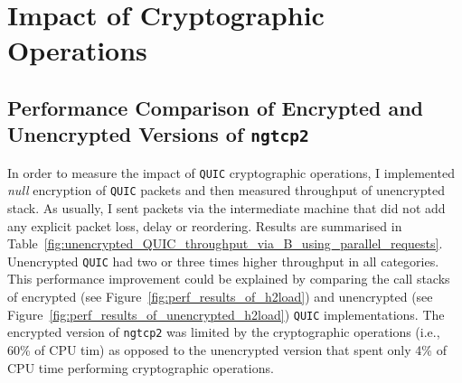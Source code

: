 \documentclass[12pt,a4paper]{report}
\newcommand\note[2]{{\color{#1}\bf #2}}
\newcommand\simon[1]{\ifcomments{\note{cyan}{SM: #1}}\fi}
\begin{document}
\section{Impact of Cryptographic Operations}




\subsection{Performance Comparison of Encrypted and Unencrypted Versions of \texttt{ngtcp2}}

In order to measure the impact of \texttt{QUIC} cryptographic operations, I implemented \textit{null} encryption of \texttt{QUIC} packets and then measured throughput of unencrypted stack.
As usually, I sent packets via the intermediate machine that did not add any explicit packet loss, delay or reordering.
Results are summarised in Table~\ref{fig:unencrypted_QUIC_throughput_via_B_using_parallel_requests}.
Unencrypted \texttt{QUIC} had two or three times higher throughput in all categories.
This performance improvement could be explained by comparing the call stacks of encrypted (see Figure~\ref{fig:perf_results_of_h2load}) and unencrypted (see Figure~\ref{fig:perf_results_of_unencrypted_h2load}) \texttt{QUIC} implementations.
The encrypted version of \texttt{ngtcp2} was limited by the cryptographic operations (i.e., 60\% of CPU tim) as opposed to the unencrypted version that spent only 4\% of CPU time performing cryptographic operations.
\end{document}
